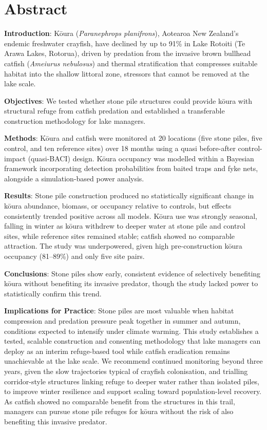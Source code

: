 \documentclass[
  12pt,
  a4paper,
  oneside]{scrbook}
\begin{document}
\section*{Abstract}\label{abstract-4}

\textbf{Introduction}: Kōura (\emph{Paranephrops planifrons}), Aotearoa
New Zealand's endemic freshwater crayfish, have declined by up to 91\%
in Lake Rotoiti (Te Arawa Lakes, Rotorua), driven by predation from the
invasive brown bullhead catfish (\emph{Ameiurus nebulosus}) and thermal
stratification that compresses suitable habitat into the shallow
littoral zone, stressors that cannot be removed at the lake scale.

\textbf{Objectives}: We tested whether stone pile structures could
provide kōura with structural refuge from catfish predation and
established a transferable construction methodology for lake managers.

\textbf{Methods}: Kōura and catfish were monitored at 20 locations (five
stone piles, five control, and ten reference sites) over 18 months using
a quasi before-after control-impact (quasi-BACI) design. Kōura occupancy
was modelled within a Bayesian framework incorporating detection
probabilities from baited traps and fyke nets, alongside a
simulation-based power analysis.

\textbf{Results}: Stone pile construction produced no statistically
significant change in kōura abundance, biomass, or occupancy relative to
controls, but effects consistently trended positive across all models.
Kōura use was strongly seasonal, falling in winter as kōura withdrew to
deeper water at stone pile and control sites, while reference sites
remained stable; catfish showed no comparable attraction. The study was
underpowered, given high pre-construction kōura occupancy (81--89\%) and
only five site pairs.

\textbf{Conclusions}: Stone piles show early, consistent evidence of
selectively benefiting kōura without benefiting its invasive predator,
though the study lacked power to statistically confirm this trend.

\textbf{Implications for Practice}: Stone piles are most valuable when
habitat compression and predation pressure peak together in summer and
autumn, conditions expected to intensify under climate warming. This
study establishes a tested, scalable construction and consenting
methodology that lake managers can deploy as an interim refuge-based
tool while catfish eradication remains unachievable at the lake scale.
We recommend continued monitoring beyond three years, given the slow
trajectories typical of crayfish colonisation, and trialling
corridor-style structures linking refuge to deeper water rather than
isolated piles, to improve winter resilience and support scaling toward
population-level recovery. As catfish showed no comparable benefit from
the structures in this trail, managers can pursue stone pile refuges for
kōura without the risk of also benefiting this invasive predator.
\end{document}
